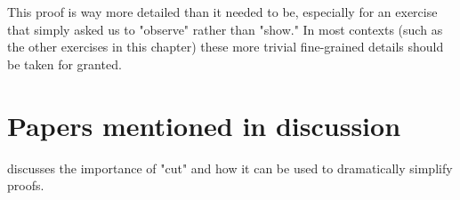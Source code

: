 \documentclass[12pt]{article}
\begin{document}
This proof is way more detailed than it needed to be, especially for an exercise that simply asked us to "observe" rather than "show." In most contexts (such as the other exercises in this chapter) these more trivial fine-grained details should be taken for granted.

\section{Papers mentioned in discussion}

\cite{Boolos1984-BOODEC} discusses the importance of "cut" and how it can be used to dramatically simplify proofs.

\printbibliography
\end{document}
